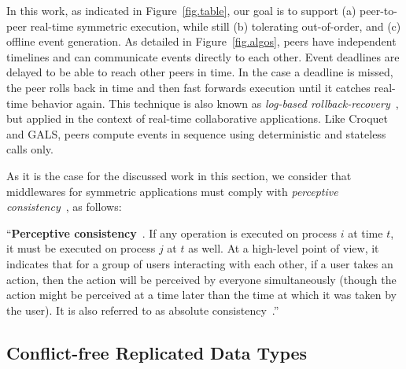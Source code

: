 \documentclass[10pt,journal,compsoc]{IEEEtran}
\begin{document}
In this work, as indicated in Figure~\ref{fig.table}, our goal is to support
    (a) peer-to-peer real-time symmetric execution, while still
    (b) tolerating out-of-order, and
    (c) offline event generation.
%
As detailed in Figure~\ref{fig.algos}, peers have independent timelines and
can communicate events directly to each other.
Event deadlines are delayed to be able to reach other peers in time.
In the case a deadline is missed, the peer rolls back in time and then fast
forwards execution until it catches real-time behavior again.
%
This technique is also known as \emph{log-based
rollback-recovery}~\cite{rollback}, but applied in the context of real-time
collaborative applications.
%
Like Croquet and GALS, peers compute events in sequence using deterministic and
stateless calls only.

As it is the case for the discussed work in this section, we consider that
middlewares for symmetric applications must comply with \emph{perceptive
consistency}~\cite{melding}, as follows:

``\textbf{Perceptive consistency}~\cite{qin,bouillot}.
If any operation is executed on process $i$ at time $t$, it must be executed on
process $j$ at $t$ as well.
At a high-level point of view, it indicates that for a group of users
interacting with each other, if a user takes an action, then the action will be
perceived by everyone simultaneously (though the action might be perceived at a
time later than the time at which it was taken by the user). It is also
referred to as absolute consistency~\cite{qin}.''

\subsection{Conflict-free Replicated Data Types}
\end{document}
